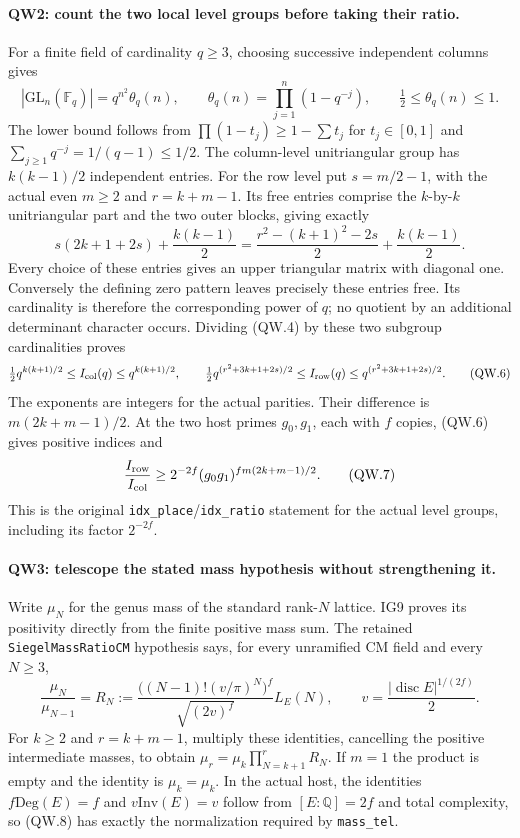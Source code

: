 \paragraph{QW2: count the two local level groups before taking their ratio.}
For a finite field of cardinality $q\ge3$, choosing successive independent
columns gives
\[
 |\mathrm{GL}_n(\mathbb F_q)|=q^{n^2}\theta_q(n),\qquad
 \theta_q(n)=\prod_{j=1}^n(1-q^{-j}),\qquad
                 \tfrac12\le\theta_q(n)\le1.                   \tag{QW.4}
\]
The lower bound follows from
$\prod(1-t_j)\ge1-\sum t_j$ for $t_j\in[0,1]$ and
$\sum_{j\ge1}q^{-j}=1/(q-1)\le1/2$.
The column-level unitriangular group has $k(k-1)/2$ independent entries.
For the row level put $s=m/2-1$, with the actual even $m\ge2$ and
$r=k+m-1$. Its free entries comprise the $k$-by-$k$ unitriangular
part and the two outer blocks, giving exactly
\[
       s(2k+1+2s)+\frac{k(k-1)}2
       =\frac{r^2-(k+1)^2-2s}2+\frac{k(k-1)}2.                  \tag{QW.5}
\]
Every choice of these entries gives an upper triangular matrix with
diagonal one. Conversely the defining zero pattern leaves precisely
these entries free. Its cardinality is therefore the corresponding
power of $q$; no quotient by an additional determinant character occurs.
Dividing (QW.4) by these two subgroup cardinalities proves
\[
 \tfrac12q^{k(k+1)/2}\le I_{\rm col}(q)\le q^{k(k+1)/2},\qquad
 \tfrac12q^{(r^2+3k+1+2s)/2}\le I_{\rm row}(q)
                   \le q^{(r^2+3k+1+2s)/2}.                   \tag{QW.6}
\]
The exponents are integers for the actual parities. Their difference
is $m(2k+m-1)/2$. At the two host primes $g_0,g_1$, each with $f$
copies, (QW.6) gives positive indices and
\[
 \frac{I_{\rm row}}{I_{\rm col}}
 \ge2^{-2f}(g_0g_1)^{fm(2k+m-1)/2}.                            \tag{QW.7}
\]
This is the original \texttt{idx\_place}/\texttt{idx\_ratio} statement
for the actual level groups, including its factor $2^{-2f}$.

\paragraph{QW3: telescope the stated mass hypothesis without strengthening it.}
Write $\mu_N$ for the genus mass of the standard rank-$N$ lattice.
IG9 proves its positivity directly from the finite positive mass sum.
The retained \texttt{SiegelMassRatioCM} hypothesis says, for every
unramified CM field and every $N\ge3$,
\[
 \frac{\mu_N}{\mu_{N-1}}
 =R_N:=\frac{\big((N-1)!(v/\pi)^N\big)^f}{\sqrt{(2v)^f}}L_E(N),
 \qquad v=\frac{|\operatorname{disc}E|^{1/(2f)}}2.               \tag{QW.8}
\]
For $k\ge2$ and $r=k+m-1$, multiply these identities, cancelling the
positive intermediate masses, to obtain
$\mu_r=\mu_k\prod_{N=k+1}^rR_N$. If $m=1$ the product is empty and
the identity is $\mu_k=\mu_k$. In the actual host, the identities
$f\mathrm{Deg}(E)=f$ and $v\mathrm{Inv}(E)=v$ follow from
$[E:\mathbb Q]=2f$ and total complexity, so (QW.8) has exactly the
normalization required by \texttt{mass\_tel}.

